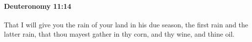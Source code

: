 
		\paragraph{Deuteronomy 11:14} %
			\label{DEUTERONOMY-11-14}

			That I will give you the rain of your land in his due season, the first rain and the latter rain, that thou mayest gather in thy corn, and thy wine, and thine oil.


